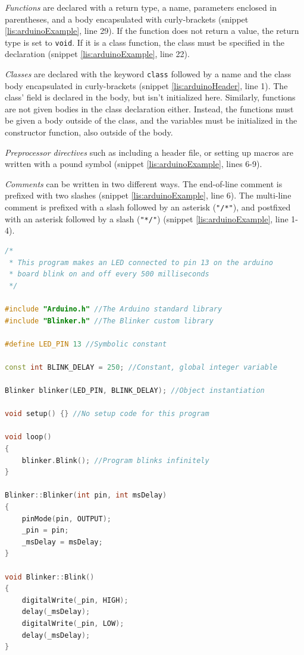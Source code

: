\textit{Functions} are declared with a return type, a name, parameters enclosed in parentheses, and a body encapsulated with curly-brackets (snippet \ref{lis:arduinoExample}, line 29).
If the function does not return a value, the return type is set to \texttt{void}.
If it is a class function, the class must be specified in the declaration (snippet \ref{lis:arduinoExample}, line 22).

\textit{Classes} are declared with the keyword \texttt{class} followed by a name and the class body encapsulated in curly-brackets (snippet \ref{lis:arduinoHeader}, line 1).
The class' field is declared in the body, but isn't initialized here.
Similarly, functions are not given bodies in the class declaration either.
Instead, the functions must be given a body outside of the class, and the variables must be initialized in the constructor function, also outside of the body.

\textit{Preprocessor directives} such as including a header file, or setting up macros are written with a pound symbol (snippet \ref{lis:arduinoExample}, lines 6-9).

\textit{Comments} can be written in two different ways.
The end-of-line comment is prefixed with two slashes (snippet \ref{lis:arduinoExample}, line 6).
The multi-line comment is prefixed with a slash followed by an asterisk (\texttt{"/*"}), and postfixed with an asterisk followed by a slash (\texttt{"*/"}) (snippet \ref{lis:arduinoExample}, line 1-4).

\begin{lstlisting}[language=C++,label=lis:arduinoExample,caption=An example program written in the Arduino language.,firstnumber=1]
/*
 * This program makes an LED connected to pin 13 on the arduino
 * board blink on and off every 500 milliseconds
 */

#include "Arduino.h" //The Arduino standard library
#include "Blinker.h" //The Blinker custom library

#define LED_PIN 13 //Symbolic constant

const int BLINK_DELAY = 250; //Constant, global integer variable

Blinker blinker(LED_PIN, BLINK_DELAY); //Object instantiation

void setup() {} //No setup code for this program

void loop()
{
    blinker.Blink(); //Program blinks infinitely
}

Blinker::Blinker(int pin, int msDelay)
{
	pinMode(pin, OUTPUT);
	_pin = pin;
	_msDelay = msDelay;
}

void Blinker::Blink()
{
	digitalWrite(_pin, HIGH);
	delay(_msDelay);
	digitalWrite(_pin, LOW);
	delay(_msDelay);
}

\end{lstlisting}


